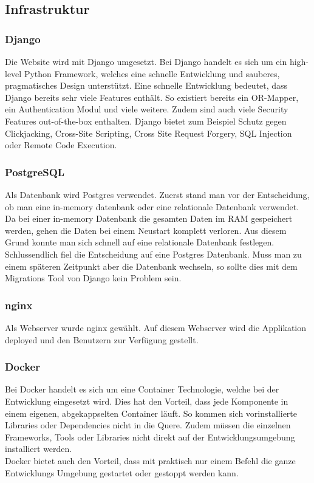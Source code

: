\subsection{Infrastruktur}
\subsubsection*{Django}
Die Website wird mit Django umgesetzt. Bei Django handelt es sich um ein high-level Python Framework, welches eine schnelle Entwicklung und sauberes, pragmatisches Design unterstützt. Eine schnelle Entwicklung bedeutet, dass Django bereits sehr viele Features enthält. So existiert bereits ein OR-Mapper, ein Authentication Modul und viele weitere. Zudem sind auch viele Security Features out-of-the-box enthalten. Django bietet zum Beispiel Schutz gegen Clickjacking, Cross-Site Scripting, Cross Site Request Forgery, SQL Injection oder Remote Code Execution.

\subsubsection*{PostgreSQL}
Als Datenbank wird Postgres verwendet. Zuerst stand man vor der Entscheidung, ob man eine in-memory datenbank oder eine relationale Datenbank verwendet. Da bei einer in-memory Datenbank die gesamten Daten im RAM gespeichert werden, gehen die Daten bei einem Neustart komplett verloren. Aus diesem Grund konnte man sich schnell auf eine relationale Datenbank festlegen. \\
Schlussendlich fiel die Entscheidung auf eine Postgres Datenbank. Muss man zu einem späteren Zeitpunkt aber die Datenbank wechseln, so sollte dies mit dem Migrations Tool von Django kein Problem sein.

\subsubsection*{nginx}
Als Webserver wurde nginx gewählt. Auf diesem Webserver wird die Applikation deployed und den Benutzern zur Verfügung gestellt. 

\subsubsection*{Docker}
Bei Docker handelt es sich um eine Container Technologie, welche bei der Entwicklung eingesetzt wird. Dies hat den Vorteil, dass jede Komponente in einem eigenen, abgekappselten Container läuft. So kommen sich vorinstallierte Libraries oder Dependencies nicht in die Quere. Zudem müssen die einzelnen Frameworks, Tools oder Libraries nicht direkt auf der Entwicklungsumgebung installiert werden. \\
Docker bietet auch den Vorteil, dass mit praktisch nur einem Befehl die ganze Entwicklungs Umgebung gestartet oder gestoppt werden kann.

